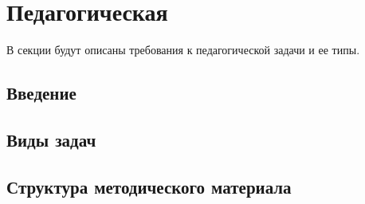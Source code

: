 \section{Педагогическая }

В секции будут описаны требования к педагогической задачи и ее типы.

\subsection{Введение}



\subsection{Виды задач}



\subsection{Структура методического материала}


